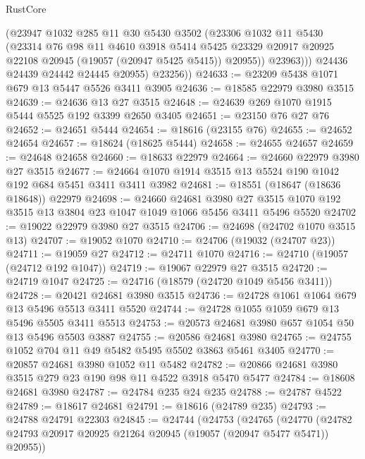 \begin{lexlean}{RustCore}
\begin{coremodule}
              (@23947
                @1032
                @285
                @11
                @30
                @5430
                @3502
                (@23306
                  @1032
                  @11
                  @5430
                  (@23314
                    @76
                    @98
                    @11
                    @4610
                    @3918
                    @5414
                    @5425
                    @23329
                    @20917
                    @20925
                    @22108
                    @20945
                    (@19057 (@20947 @5425 @5415))
                    @20955))
                @23963)))
          @24436
          @24439
          @24442
          @24445
          @20955)
        @23256))
@24633 := @23209 @5438 @1071 @679 @13 @5447 @5526 @3411 @3905
@24636 := @18585 @22979 @3980 @3515
@24639 := @24636 @13 @27 @3515
@24648 := @24639 @269 @1070 @1915 @5444 @5525 @192 @3399 @2650 @3405
@24651 := @23150 @76 @27 @76
@24652 := @24651 @5444
@24654 := @18616 (@23155 @76)
@24655 := @24652 @24654
@24657 := @18624 (@18625 @5444)
@24658 := @24655 @24657
@24659 := @24648 @24658
@24660 := @18633 @22979
@24664 := @24660 @22979 @3980 @27 @3515
@24677 := @24664 @1070 @1914 @3515 @13 @5524 @190 @1042 @192 @684 @5451 @3411 @3411 @3982
@24681 := @18551 (@18647 (@18636 @18648)) @22979
@24698 := @24660
    @24681
    @3980
    @27
    @3515
    @1070
    @192
    @3515
    @13
    @3804
    @23
    @1047
    @1049
    @1066
    @5456
    @3411
    @5496
    @5520
@24702 := @19022 @22979 @3980 @27 @3515
@24706 := @24698 (@24702 @1070 @3515 @13)
@24707 := @19052 @1070
@24710 := @24706 (@19032 (@24707 @23))
@24711 := @19059 @27
@24712 := @24711 @1070
@24716 := @24710 (@19057 (@24712 @192 @1047))
@24719 := @19067 @22979 @27 @3515
@24720 := @24719 @1047
@24725 := @24716 (@18579 (@24720 @1049 @5456 @3411))
@24728 := @20421 @24681 @3980 @3515
@24736 := @24728 @1061 @1064 @679 @13 @5496 @5513 @3411 @5520
@24744 := @24728 @1055 @1059 @679 @13 @5496 @5505 @3411 @5513
@24753 := @20573 @24681 @3980 @657 @1054 @50 @13 @5496 @5503 @3887
@24755 := @20586 @24681 @3980
@24765 := @24755 @1052 @704 @11 @49 @5482 @5495 @5502 @3863 @5461 @3405
@24770 := @20857 @24681 @3980 @1052 @11 @5482
@24782 := @20866 @24681 @3980 @3515 @279 @23 @190 @98 @11 @4522 @3918 @5470 @5477
@24784 := @18608 @24681 @3980
@24787 := @24784 @235 @24 @235
@24788 := @24787 @4522
@24789 := @18617 @24681
@24791 := @18616 (@24789 @235)
@24793 := @24788 @24791 @22303
@24845 := @24744
    (@24753
      (@24765
        (@24770 (@24782 @24793 @20917 @20925 @21264 @20945 (@19057 (@20947 @5477 @5471)) @20955))

\end{coremodule}
\end{lexlean}
